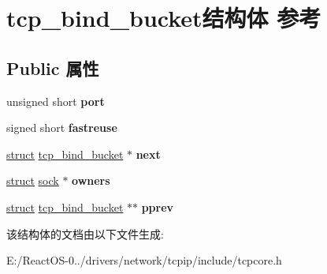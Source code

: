 \hypertarget{structtcp__bind__bucket}{}\section{tcp\+\_\+bind\+\_\+bucket结构体 参考}
\label{structtcp__bind__bucket}
\subsection*{Public 属性}
\begin{DoxyCompactItemize}
\item 
\mbox{\label{structtcp__bind__bucket_ad9893761db98446a4939b086174846bc}} 
unsigned short {\bfseries port}
\item 
\mbox{\label{structtcp__bind__bucket_a60ec049b2c6c3d49c60ecde18685f345}} 
signed short {\bfseries fastreuse}
\item 
\mbox{\label{structtcp__bind__bucket_a6e2082f83798a67bfeccca933ebdc567}} 
\hyperlink{interfacestruct}{struct} \hyperlink{structtcp__bind__bucket}{tcp\+\_\+bind\+\_\+bucket} $\ast$ {\bfseries next}
\item 
\mbox{\label{structtcp__bind__bucket_a58a28d8c442584c12e41774c0d6909be}} 
\hyperlink{interfacestruct}{struct} \hyperlink{structsock}{sock} $\ast$ {\bfseries owners}
\item 
\mbox{\label{structtcp__bind__bucket_a700205883e69bb4bd3ee7be3dbffb5de}} 
\hyperlink{interfacestruct}{struct} \hyperlink{structtcp__bind__bucket}{tcp\+\_\+bind\+\_\+bucket} $\ast$$\ast$ {\bfseries pprev}
\end{DoxyCompactItemize}


该结构体的文档由以下文件生成\+:\begin{DoxyCompactItemize}
\item 
E\+:/\+React\+O\+S-\/0../drivers/network/tcpip/include/tcpcore.\+h\end{DoxyCompactItemize}
